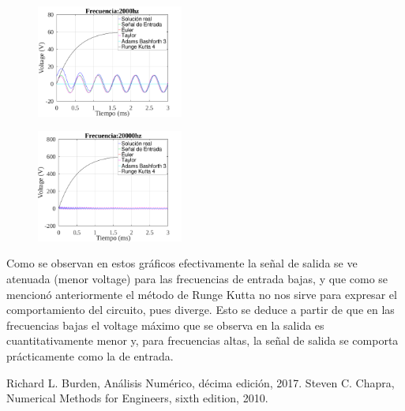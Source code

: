\documentclass[letterpaper, 10 pt, conference]{ieeeconf}  %
\begin{document}
\begin{figure}[H]
\centering
\includegraphics[width=0.43\textwidth]{../plots/ej5/Frecuencia:2000hz-ue.png}
\label{fig:fig}
\end{figure}

\begin{figure}[H]
\centering
\includegraphics[width=0.43\textwidth]{../plots/ej5/Frecuencia:20000hz-ue.png}
\label{fig:fig}
\end{figure}

Como se observan en estos gr\'aficos efectivamente la señal de salida se ve atenuada (menor voltage) para las frecuencias de entrada bajas, y que como se mencion\'o anteriormente el m\'etodo de Runge Kutta no nos sirve para expresar el comportamiento del circuito, pues diverge. Esto se deduce a partir de que en las frecuencias bajas el voltage m\'aximo que se observa en la salida es cuantitativamente menor y, para frecuencias altas, la señal de salida se comporta pr\'acticamente como la de entrada.
\begin{thebibliography}{99}

	Richard L. Burden, An\'alisis Num\'erico, d\'ecima edici\'on, 2017.
    Steven C. Chapra, Numerical Methods for Engineers, sixth edition, 2010.

\end{thebibliography}
\end{document}
